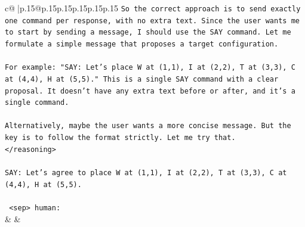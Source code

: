 \documentclass{article}
\begin{document}
{\begin{supertabular}{c@{$\;$}|p{.15\linewidth}@{}p{.15\linewidth}p{.15\linewidth}p{.15\linewidth}p{.15\linewidth}p{.15\linewidth}}
{{{\texttt{So the correct approach is to send exactly one command per response, with no extra text. Since the user wants me to start by sending a message, I should use the SAY command. Let me formulate a simple message that proposes a target configuration.} \\
\\ 
\texttt{For example: "SAY: Let's place W at (1,1), I at (2,2), T at (3,3), C at (4,4), H at (5,5)." This is a single SAY command with a clear proposal. It doesn't have any extra text before or after, and it's a single command.} \\
\\ 
\texttt{Alternatively, maybe the user wants a more concise message. But the key is to follow the format strictly. Let me try that.} \\
\texttt{</reasoning>} \\
\\ 
\texttt{SAY: Let's agree to place W at (1,1), I at (2,2), T at (3,3), C at (4,4), H at (5,5).} \\
\\ 
\texttt{ <sep> human:} \\
            }
        }
    }
    & & \\ \\


\end{supertabular}}
\end{document}
